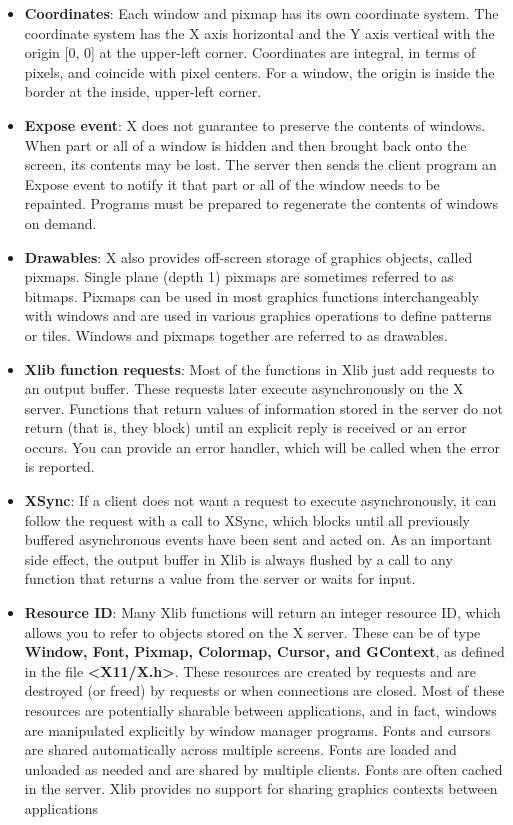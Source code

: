 \documentclass{report}
\begin{document}
\begin{itemize}
        \item \textbf{Coordinates}: Each window and pixmap has its own coordinate system. The coordinate system has the X axis horizontal and the Y axis vertical with the origin [0, 0] at the upper-left corner. Coordinates are integral, in terms of pixels, and coincide with pixel centers. For a window, the origin is inside the border at the inside, upper-left corner.
        \item \textbf{Expose event}: X does not guarantee to preserve the contents of windows. When part or all of a window is hidden and then brought back onto the screen, its contents may be lost. The server then sends the client program an Expose event to notify it that part or all of the window needs to be repainted. Programs must be prepared to regenerate the contents of windows on demand.
        \item \textbf{Drawables}: X also provides off-screen storage of graphics objects, called pixmaps. Single plane (depth 1) pixmaps are sometimes referred to as bitmaps. Pixmaps can be used in most graphics functions interchangeably with windows and are used in various graphics operations to define patterns or tiles. Windows and pixmaps together are referred to as drawables.
        \item \textbf{Xlib function requests}: Most of the functions in Xlib just add requests to an output buffer. These requests later execute asynchronously on the X server. Functions that return values of information stored in the server do not return (that is, they block) until an explicit reply is received or an error occurs. You can provide an error handler, which will be called when the error is reported.
        \item \textbf{XSync}: If a client does not want a request to execute asynchronously, it can follow the request with a call to XSync, which blocks until all previously buffered asynchronous events have been sent and acted on. As an important side effect, the output buffer in Xlib is always flushed by a call to any function that returns a value from the server or waits for input.
        \item \textbf{Resource ID}: Many Xlib functions will return an integer resource ID, which allows you to refer to objects stored on the X server. These can be of type \textbf{Window, Font, Pixmap, Colormap, Cursor, and GContext}, as defined in the file \textbf{<X11/X.h>}. These resources are created by requests and are destroyed (or freed) by requests or when connections are closed. Most of these resources are potentially sharable between applications, and in fact, windows are manipulated explicitly by window manager programs. Fonts and cursors are shared automatically across multiple screens. Fonts are loaded and unloaded as needed and are shared by multiple clients. Fonts are often cached in the server. Xlib provides no support for sharing graphics contexts between applications

\end{itemize}
\end{document}
